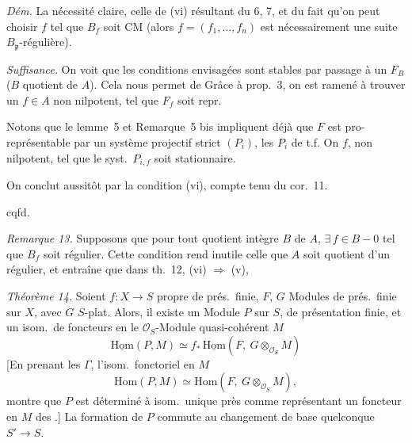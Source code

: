 \documentclass[11pt,a4paper]{article}
\begin{document}
\emph{Dém.} La nécessité claire, celle de (vi) résultant du  6,
 7, et du fait qu'on peut choisir $f$ tel que $B_f$ soit
CM (alors $\underline{f} = (f_1, \ldots, f_n)$ est nécessairement une suite
\struck{\ill{}} $B_{\mathfrak{p}}$-régulière).

\emph{Suffisance.} On voit que les conditions envisagées sont stables par
passage à un $F_B$ ($B$ quotient de $A$). Cela nous permet de
 \struck{\ill{}} Grâce à prop.~3, on est
ramené à trouver un $f \in A$ non nilpotent, tel que $F_f$ soit repr.

Notons que le lemme~5 et Remarque~5 bis impliquent déjà que $F$ est
pro-représentable par un système projectif strict $(P_i)$, les $P_i$ de t.f.
On   \ill{} $f$, non nilpotent, tel que
le syst.\ $P_{i,f}$ soit stationnaire.

On conclut aussitôt par la  condition (vi), compte tenu du
cor.~11. 

cqfd.

\emph{Remarque 13.} Supposons que pour tout quotient intègre $B$ de $A$,
$\exists\, f \in B - 0$ tel que $B_f$ soit régulier. Cette condition rend
 inutile celle que $A$ soit quotient d'un régulier, et
entraîne que dans th.~12, (vi) $\Rightarrow$ (v), 

\emph{Théorème 14.} Soient $f \colon X \to S$ propre de prés.\ finie, $F$, $G$
Modules de prés.\ finie sur $X$, avec $G$ $S$-plat. Alors,
\struck{\ill{}} il existe un Module $P$ sur $S$, de présentation finie, et un
isom.\ de foncteurs en le $\mathcal{O}_S$-Module quasi-cohérent $M$
\[
  \underline{\mathrm{Hom}}(P, M) \simeq
  f_{*}\,\underline{\mathrm{Hom}}(F,\ G \otimes_{\mathcal{O}_S} M)
\]
[En prenant les $\Gamma$, l'isom.\ fonctoriel en $M$
\[
  \mathrm{Hom}(P, M) \simeq \mathrm{Hom}(F,\ G \otimes_{\mathcal{O}_S} M),
\]
montre que $P$ est déterminé à isom.\ unique près comme représentant un
foncteur en $M$ des  \ill{}.] La formation de $P$ commute
au changement de base quelconque $S' \to S$.
\end{document}
